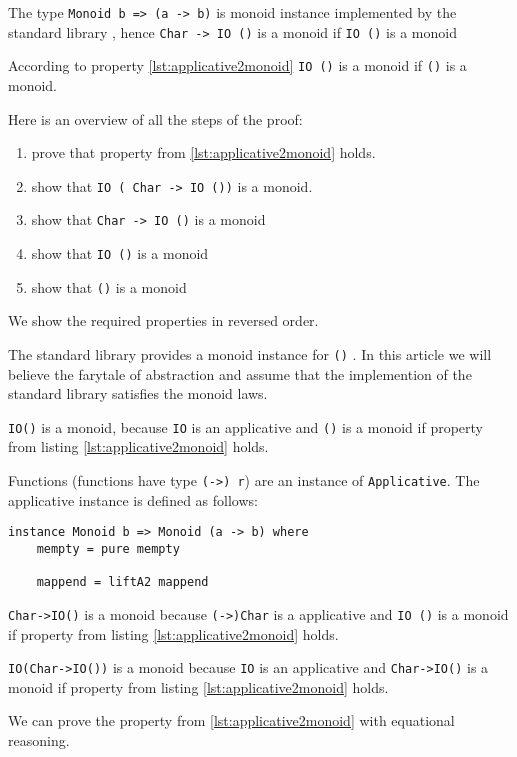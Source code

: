 \documentclass[twoside, a4paper]{article}
\begin{document}
The type \verb|Monoid b => (a -> b)| is monoid instance implemented by the standard library \cite{monoid}, hence \verb|Char -> IO ()| is a monoid if \verb|IO ()| is a monoid

According to property \ref{lst:applicative2monoid} \verb|IO ()| is a monoid if \verb|()| is a monoid.

Here is an overview of all the steps of the proof:
\begin{enumerate}
\item prove that property from \ref{lst:applicative2monoid} holds.
\item show that  \verb|IO ( Char -> IO ())| is a monoid.
\item show that \verb|Char -> IO ()| is a monoid
\item show that \verb|IO ()| is a monoid
\item show that \verb|()| is a monoid
\end{enumerate}

We show the required properties in reversed order.

\begin{etaremune}
\item The standard library provides a monoid instance for \verb|()| \cite{monoid}. In this article we will believe the farytale of abstraction and assume that the implemention of the standard library satisfies the monoid laws.
\item \verb|IO()| is a monoid, because \verb|IO| is an applicative and \verb|()| is a monoid if property from listing \ref{lst:applicative2monoid} holds.
\item Functions (functions have type \verb|(->) r|) are an instance of \verb|Applicative|. The applicative instance is defined as follows:
\begin{verbatim}
instance Monoid b => Monoid (a -> b) where
    mempty = pure mempty

    mappend = liftA2 mappend
\end{verbatim}
 \verb|Char->IO()| is a monoid because \verb|(->)Char| is a applicative and \verb|IO ()| is a monoid if property from listing \ref{lst:applicative2monoid} holds.
\item \verb|IO(Char->IO())| is a monoid because \verb|IO| is an applicative and \verb|Char->IO()| is a monoid if property from listing \ref{lst:applicative2monoid} holds.
\item  We can prove the property from \ref{lst:applicative2monoid} with equational reasoning.
\end{etaremune} 
\end{document}
